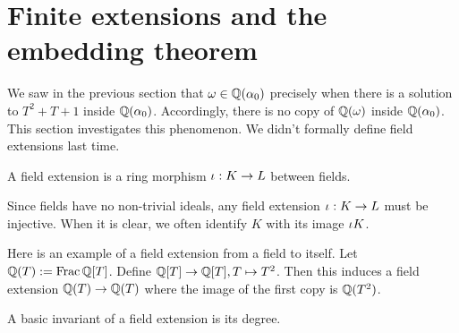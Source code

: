 \documentclass{article}
\begin{document}

\section{Finite extensions and the embedding theorem}

We saw in the previous section that 
$\omega \in \mathbb{Q}(\alpha_0)$ precisely when there is a solution to $T^2 + T + 1$
inside $\mathbb{Q}(\alpha_0)$.
Accordingly, there is no copy of $\mathbb{Q}(\omega)$ inside $\mathbb{Q}(\alpha_0)$.
This section investigates this phenomenon.
We didn't formally define field extensions last time.

\begin{dfn}
  A field extension is a ring morphism $\iota : K \to L$ between fields.
  
  Since fields have no non-trivial ideals,
  any field extension $\iota : K \to L$ must be injective.
  When it is clear, we often identify $K$ with its image $\iota K$.
\end{dfn}

\begin{eg}
  Here is an example of a field extension from a field to itself.
  Let $\mathbb{Q}(T) := \mathrm{Frac}\,\mathbb{Q}[T]$.
  Define $\mathbb{Q}[T] \to \mathbb{Q}[T] , T \mapsto T^2$.
  Then this induces a field extension $\mathbb{Q}(T) \to \mathbb{Q}(T)$
  where the image of the first copy is $\mathbb{Q}(T^2)$.
\end{eg}

A basic invariant of a field extension is its degree.
\end{document}
